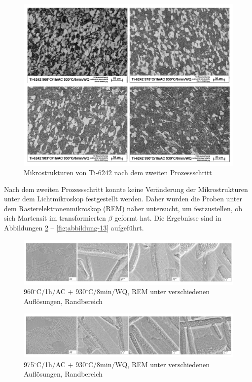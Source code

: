 \begin{figure}[h]
	\centering
	\includegraphics[width=0.9\linewidth]{./Bilder/Abbildung 9}
	\caption[Abbildung 9]{Mikrostrukturen von Ti-6242 nach dem zweiten Prozessschritt}
	\label{fig:abbildung-9}
\end{figure}

Nach dem zweiten Prozessschritt konnte keine Veränderung der Mikrostrukturen unter dem Lichtmikroskop festgestellt werden. Daher wurden die Proben unter dem Rasterelektronenmikroskop (REM) näher untersucht, um festzustellen, ob sich Martensit im transformierten $\beta$ geformt hat. Die Ergebnisse sind in Abbildungen \ref{fig:abbildung-10} -- \ref{fig:abbildung-13} aufgeführt. 

\begin{figure}[!]
	\centering
	\includegraphics[width=0.9\linewidth]{./Bilder/Abbildung 10}
	\caption[Abbildung 10]{960$^\circ$C/1h/AC + 930$^\circ$C/8min/WQ, REM unter verschiedenen Auflösungen, Randbereich}
	\label{fig:abbildung-10}
\end{figure}

\begin{figure}[!]
	\centering
	\includegraphics[width=0.9\linewidth]{./Bilder/Abbildung 11}
	\caption[Abbildung 11]{975$^\circ$C/1h/AC + 930$^\circ$C/8min/WQ, REM unter verschiedenen Auflösungen, Randbereich}
	\label{fig:abbildung-11}
\end{figure}

